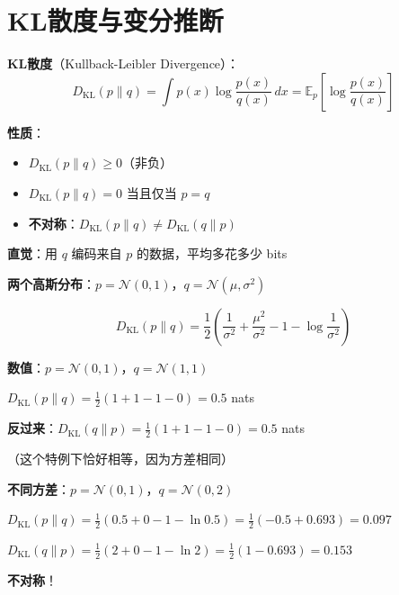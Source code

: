 \documentclass[12pt, a4paper]{ctexart}
\begin{document}
\section{KL散度与变分推断}

\begin{blackboard}[KL散度的定义]

\textbf{KL散度}（Kullback-Leibler Divergence）：
\[
D_{\text{KL}}(p \| q) = \int p(x) \log \frac{p(x)}{q(x)} \, dx = \mathbb{E}_{p}\left[ \log \frac{p(x)}{q(x)} \right]
\]

\textbf{性质}：
\begin{itemize}
    \item $D_{\text{KL}}(p \| q) \geq 0$（非负）
    \item $D_{\text{KL}}(p \| q) = 0$ 当且仅当 $p = q$
    \item \textbf{不对称}：$D_{\text{KL}}(p \| q) \neq D_{\text{KL}}(q \| p)$
\end{itemize}

\textbf{直觉}：用 $q$ 编码来自 $p$ 的数据，平均多花多少 bits

\end{blackboard}

\begin{blackboard}[KL散度的数值例子]

\textbf{两个高斯分布}：$p = \mathcal{N}(0, 1)$，$q = \mathcal{N}(\mu, \sigma^2)$

\[
D_{\text{KL}}(p \| q) = \frac{1}{2}\left( \frac{1}{\sigma^2} + \frac{\mu^2}{\sigma^2} - 1 - \log\frac{1}{\sigma^2} \right)
\]

\textbf{数值}：$p = \mathcal{N}(0, 1)$，$q = \mathcal{N}(1, 1)$

$D_{\text{KL}}(p \| q) = \frac{1}{2}(1 + 1 - 1 - 0) = \mathbf{0.5}$ nats

\textbf{反过来}：$D_{\text{KL}}(q \| p) = \frac{1}{2}(1 + 1 - 1 - 0) = \mathbf{0.5}$ nats

（这个特例下恰好相等，因为方差相同）

\textbf{不同方差}：$p = \mathcal{N}(0, 1)$，$q = \mathcal{N}(0, 2)$

$D_{\text{KL}}(p \| q) = \frac{1}{2}(0.5 + 0 - 1 - \ln 0.5) = \frac{1}{2}(-0.5 + 0.693) = \mathbf{0.097}$

$D_{\text{KL}}(q \| p) = \frac{1}{2}(2 + 0 - 1 - \ln 2) = \frac{1}{2}(1 - 0.693) = \mathbf{0.153}$

\textbf{不对称}！

\end{blackboard}
\end{document}

